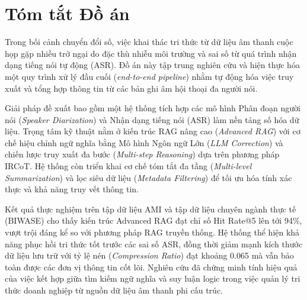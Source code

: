 \chapter*{Tóm tắt Đồ án} %

Trong bối cảnh chuyển đổi số, việc khai thác tri thức từ dữ liệu âm thanh cuộc họp gặp nhiều trở ngại do đặc thù nhiễu môi trường và sai số từ quá trình nhận dạng tiếng nói tự động (ASR). Đồ án này tập trung nghiên cứu và hiện thực hóa một quy trình xử lý đầu cuối (\textit{end-to-end pipeline}) nhằm tự động hóa việc truy xuất và tổng hợp thông tin từ các bản ghi âm hội thoại đa người nói.

Giải pháp đề xuất bao gồm một hệ thống tích hợp các mô hình Phân đoạn người nói (\textit{Speaker Diarization}) và Nhận dạng tiếng nói (ASR) làm nền tảng số hóa dữ liệu. Trọng tâm kỹ thuật nằm ở kiến trúc RAG nâng cao (\textit{Advanced RAG}) với cơ chế hiệu chỉnh ngữ nghĩa bằng Mô hình Ngôn ngữ Lớn (\textit{LLM Correction}) và chiến lược truy xuất đa bước (\textit{Multi-step Reasoning}) dựa trên phương pháp IRCoT. Hệ thống còn triển khai cơ chế tóm tắt đa tầng (\textit{Multi-level Summarization}) và lọc siêu dữ liệu (\textit{Metadata Filtering}) để tối ưu hóa tính xác thực và khả năng truy vết thông tin.

Kết quả thực nghiệm trên tập dữ liệu AMI và tập dữ liệu chuyên ngành thực tế (BIWASE) cho thấy kiến trúc Advanced RAG đạt chỉ số Hit Rate@5 lên tới 94\%, vượt trội đáng kể so với phương pháp RAG truyền thống. Hệ thống thể hiện khả năng phục hồi tri thức tốt trước các sai số ASR, đồng thời giảm mạnh kích thước dữ liệu lưu trữ với tỷ lệ nén (\textit{Compression Ratio}) đạt khoảng 0.065 mà vẫn bảo toàn được các đơn vị thông tin cốt lõi. Nghiên cứu đã chứng minh tính hiệu quả của việc kết hợp giữa tìm kiếm ngữ nghĩa và suy luận logic trong việc quản lý tri thức doanh nghiệp từ nguồn dữ liệu âm thanh phi cấu trúc.